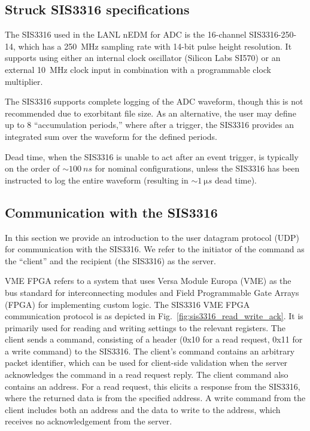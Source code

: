
\subsection{Struck SIS3316 specifications}\label{sec:sis3316_specs}


The SIS3316 used in the LANL nEDM for ADC is the 16-channel SIS3316-250-14, which has a \qty{250}{MHz} sampling rate with 14-bit pulse height resolution. It supports using either an internal clock oscillator (Silicon Labs SI570) or an external \qty{10}{MHz} clock input in combination with a programmable clock multiplier.

The SIS3316 supports complete logging of the ADC waveform, though this is not recommended due to exorbitant file size. As an alternative, the user may define up to 8 ``accumulation periods,'' where after a trigger, the SIS3316 provides an integrated sum over the waveform for the defined periods.

Dead time, when the SIS3316 is unable to act after an event trigger, is typically on the order of $\sim\qty{100}{ns}$ for nominal configurations, unless the SIS3316 has been instructed to log the entire waveform (resulting in $\sim\qty{1}{\micro s}$ dead time).



\subsection{Communication with the SIS3316}\label{sec:sis3316_udp_protocol}


In this section we provide an introduction to the user datagram protocol (UDP) for communication with the SIS3316. We refer to the initiator of the command as the ``client'' and the recipient (the SIS3316) as the server.

VME FPGA refers to a system that uses Versa Module Europa (VME) as the bus standard for interconnecting modules and Field Programmable Gate Arrays (FPGA) for implementing custom logic. The SIS3316 VME FPGA communication protocol is as depicted in Fig.~\ref{fig:sis3316_read_write_ack}. It is primarily used for reading and writing settings to the relevant registers. The client sends a command, consisting of a header (0x10 for a read request, 0x11 for a write command) to the SIS3316. The client's command contains an arbitrary packet identifier, which can be used for client-side validation when the server acknowledges the command in a read request reply. The client command also contains an address. For a read request, this elicits a response from the SIS3316, where the returned data is from the specified address. A write command from the client includes both an address and the data to write to the address, which receives no acknowledgement from the server.

